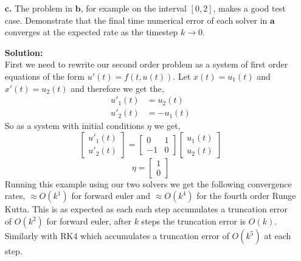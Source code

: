 \documentclass[12pt]{article}
\makeatletter
\theoremstyle{homework}
\newenvironment{exercise}[1]
{\def\@currentlabel{#1}\exercisecore}
{\endexercisecore}
\newcommand{\localhead}[1]{\par\smallskip\noindent\textbf{#1}\nobreak\\}%
\newcommand\solution{\localhead{Solution:}}
\makeatother
\begin{document}
\begin{exercise}{Problem P27}
\begin{enumerate}
    \item[\textbf{c.}] The problem in $\textbf{b}$, for example on the interval $[0, 2]$, 
    makes a good test case. Demonstrate that the final time numerical error of each solver in $\textbf{a}$
    converges at the expected rate as the timestep $k \to 0$. 
    \solution First we need to rewrite our second order problem as a system of first order equations of the form $u'(t) = f(t, u(t))$. 
    Let $x(t) = u_1(t)$ and $x'(t) = u_2(t)$ and therefore we get the, 
    \begin{align*}
      u'_1(t) &= u_2(t)\\
      u'_2(t) &= -u_1(t)
    \end{align*}
    So as a system with initial conditions $\eta$ we get, 
    \begin{equation*}
      \begin{bmatrix}
        u'_1(t)\\
        u'_2(t)
      \end{bmatrix} = 
      \begin{bmatrix}
        0 & 1\\
        -1 & 0
      \end{bmatrix}
      \begin{bmatrix}
        u_1(t)\\
        u_2(t)
      \end{bmatrix}
    \end{equation*}
    \begin{equation*}
      \eta = \begin{bmatrix}
        1\\
        0
      \end{bmatrix}
    \end{equation*}
    Running this example using our two solvers we get the following convergence rates, $\approx O(k^1)$ for forward euler and $\approx O(k^4)$ for 
    the fourth order Runge Kutta. This is as expected as each each step accumulates a truncation error of $O(k^2)$ for forward euler, after $k$ steps 
    the truncation error is $O(k)$. Similarly with RK4 which accumulates a truncation error of $O(k^5)$ at each step. 


\end{enumerate}
\end{exercise}
\end{document}

